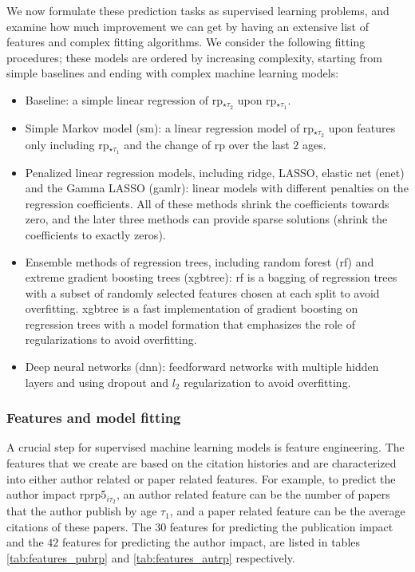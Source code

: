 We now formulate these prediction tasks as supervised learning problems, and examine how much improvement we can get by having an extensive list of features and complex fitting algorithms. We consider the following fitting procedures; these models are ordered by increasing complexity, starting from simple baselines and ending with complex machine learning models:
\begin{itemize}
    \item Baseline: a simple linear regression of rp$_{\star \tau_2}$ upon rp$_{\star \tau_1}$.
    \item Simple Markov model (sm): a linear regression model of rp$_{\star \tau_2}$ upon features only including rp$_{\star \tau_1}$ and the change of rp over the last $2$ ages.
    \item Penalized linear regression models, including ridge\supercite{hoerl1970ridge}, LASSO\supercite{tibshirani1996regression}, elastic net (enet)\supercite{zou2005regularization} and the Gamma LASSO (gamlr)\supercite{taddy2017one}: linear models with different penalties on the regression coefficients. All of these methods shrink the coefficients towards zero, and the later three methods can provide sparse solutions (shrink the coefficients to exactly zeros). 
    \item Ensemble methods of regression trees, including random forest (rf)\supercite{liaw2002classification} and extreme gradient boosting trees (xgbtree)\supercite{chen2016xgboost}: rf is a bagging of regression trees with a subset of randomly selected features chosen at each split to avoid overfitting. xgbtree is a fast implementation of gradient boosting on regression trees with a model formation that emphasizes the role of regularizations to avoid overfitting.
    \item Deep neural networks (dnn): feedforward networks with multiple hidden layers and using dropout and $l_2$ regularization to avoid overfitting.
\end{itemize}

\subsubsection*{Features and model fitting}
A crucial step for supervised machine learning models is feature engineering. The features that we create are based on the citation histories and are characterized into either author related or paper related features. For example, to predict the author impact rprp5$_{i\tau_2}$, an author related feature can be the number of papers that the author publish by age $\tau_1$, and a paper related feature can be the average citations of these papers. The $30$ features for predicting the publication impact and the $42$ features for predicting the author impact, are listed in tables \ref{tab:features_pubrp} and \ref{tab:features_autrp} respectively. 

